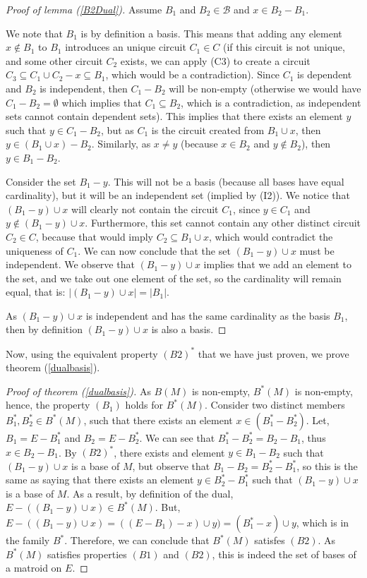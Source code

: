 \begin{proof}[Proof of lemma (\ref{B2Dual})]
Assume $B_1$ and $B_2 \in \mathcal{B}$ and $x \in B_2 - B_1$.

    We note that $B_1$ is by definition a basis. This means that adding any element $x \not\in B _1 $ to $B _1 $ introduces an unique circuit $C_1 \in C$ (if this circuit is not unique, and some other circuit $C _2 $ exists, we can apply (C3) to create a circuit $C _3 \subseteq C _1 \cup C _2 - x \subseteq B _1$, which would be a contradiction). Since $C_1$ is dependent and $B_2$ is independent, then $C_1 - B_2$ will be non-empty (otherwise we would have $C _1 - B _2 = \emptyset$ which implies that $C _1 \subseteq B _2$, which is a contradiction, as independent sets cannot contain dependent sets). This implies that there exists an element $y$ such that $y \in C_1 - B_2$, but as $C_1$ is the circuit created from $B_1 \cup x$, then $y \in (B_1 \cup x) - B_2$. Similarly, as $x \neq y$ (because $x \in B _2 $ and $y \not\in B _2$), then $y \in B_1 - B_2$. 

    Consider the set $B_1 - y$. This will not be a basis (because all bases have equal cardinality), but it will be an independent set (implied by (I2)). We notice that $(B_1 - y)\cup x$ will clearly not contain the circuit $C_1$, since $y \in C _1 $ and $y \not\in (B _1 - y) \cup x$. Furthermore, this set cannot contain any other distinct circuit $C _2 \in C$, because that would imply $C _2 \subseteq B _1 \cup x$, which would contradict the uniqueness of $C _1 $. We can now conclude that the set $(B_1 - y)\cup x$ must be independent. We observe that $(B_1 - y)\cup x$ implies that we add an element to the set, and we take out one element of the set, so the cardinality will remain equal, that is: $|(B_1 - y)\cup x|=|B_1|$.

As $(B_1 - y)\cup x$ is independent and has the same cardinality as the basis $B_1$, then by definition $(B_1 - y)\cup x$ is also a basis. 
\end{proof}

Now, using the equivalent property $(B2)^*$ that we have just proven, we prove theorem (\ref{dualbasis}).
\begin{proof}[Proof of theorem (\ref{dualbasis})]
    As $B(M)$ is non-empty, $B^*(M)$ is non-empty, hence, the property $(B_1)$ holds for $B^*(M)$. 
    Consider two distinct members $B ^* _1 , B ^* _2 \in B^*(M)$, such that there exists an element $x \in (B^*_1 - B^*_2)$. Let, $B_1 = E - B^*_1$ and $B_2 = E - B^*_2$. We can see that $B^*_1 - B^*_2 = B_2 - B_1$, thus $x \in B_2 - B_1$. By ${(B2)}^*$, there exists and element $y \in  B_1 - B_2$ such that $(B_1 - y)\cup x$ is a base of $M$, but observe that $B_1 - B_2 = B^*_2 - B^*_1$, so this is the same as saying that there exists an element $y \in  B^*_2 - B^*_1$ such that $(B_1 - y)\cup x$ is a base of $M$. As a result, by definition of the dual, $E-((B_1 - y)\cup x) \in B^*(M)$. But, $E-((B_1 - y)\cup x) = ((E-B_1)-x)\cup y) = (B_1^* - x)\cup y$, which is in the family $B^*$. Therefore, we can conclude that $B^*(M)$ satisfes $(B2)$. As $B^*(M)$ satisfies  properties $(B1)$ and $(B2)$, this is indeed the set of bases of a matroid on $E$.
\end{proof}

